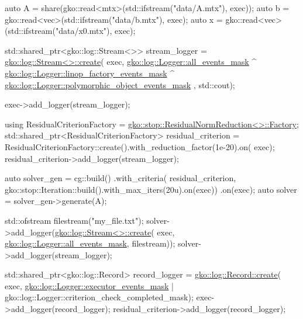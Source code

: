 \begin{DoxyCodeInclude}
    \textcolor{keyword}{auto} A = share(gko::read<mtx>(std::ifstream(\textcolor{stringliteral}{"data/A.mtx"}), exec));
    \textcolor{keyword}{auto} b = gko::read<vec>(std::ifstream(\textcolor{stringliteral}{"data/b.mtx"}), exec);
    \textcolor{keyword}{auto} x = gko::read<vec>(std::ifstream(\textcolor{stringliteral}{"data/x0.mtx"}), exec);

    std::shared\_ptr<gko::log::Stream<>> stream\_logger =
        \hyperlink{classgko_1_1log_1_1Stream_a71f96d3f1cd7c03875476cd8db98145b}{gko::log::Stream<>::create}(
            exec,
            \hyperlink{classgko_1_1log_1_1Logger_a02534863a2d2f92dfeb2c39038365532}{gko::log::Logger::all\_events\_mask} ^
                \hyperlink{classgko_1_1log_1_1Logger_ad6fb77d4d5610bc7299087f7149a7f16}{gko::log::Logger::linop\_factory\_events\_mask} ^
                \hyperlink{classgko_1_1log_1_1Logger_a5fb997f1c06c0602103d8dab616a96bc}{gko::log::Logger::polymorphic\_object\_events\_mask}
      ,
            std::cout);

    exec->add\_logger(stream\_logger);

    \textcolor{keyword}{using} ResidualCriterionFactory =
        \hyperlink{classgko_1_1stop_1_1ResidualNormReduction_1_1Factory}{gko::stop::ResidualNormReduction<>::Factory};
    std::shared\_ptr<ResidualCriterionFactory> residual\_criterion =
        ResidualCriterionFactory::create().with\_reduction\_factor(1e-20).on(
            exec);
    residual\_criterion->add\_logger(stream\_logger);

    \textcolor{keyword}{auto} solver\_gen =
        cg::build()
            .with\_criteria(
                residual\_criterion,
                gko::stop::Iteration::build().with\_max\_iters(20u).on(exec))
            .on(exec);
    \textcolor{keyword}{auto} solver = solver\_gen->generate(A);


    std::ofstream filestream(\textcolor{stringliteral}{"my\_file.txt"});
    solver->add\_logger(\hyperlink{classgko_1_1log_1_1Stream}{gko::log::Stream<>::create}(
        exec, \hyperlink{classgko_1_1log_1_1Logger_a02534863a2d2f92dfeb2c39038365532}{gko::log::Logger::all\_events\_mask}, filestream));
    solver->add\_logger(stream\_logger);

    std::shared\_ptr<gko::log::Record> record\_logger = \hyperlink{classgko_1_1log_1_1Record_ab3863ff409b8ceaefa2f226a4e26debc}{gko::log::Record::create}(
        exec, \hyperlink{classgko_1_1log_1_1Logger_af263708ebb15007bc0086e7c438c190c}{gko::log::Logger::executor\_events\_mask} |
                  gko::log::Logger::criterion\_check\_completed\_mask);
    exec->add\_logger(record\_logger);
    residual\_criterion->add\_logger(record\_logger);


\end{DoxyCodeInclude}
